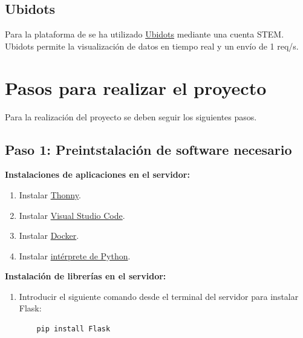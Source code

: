 \documentclass{article}
\begin{document}
\subsection{Ubidots}
Para la plataforma de se ha utilizado \href{https://stem.ubidots.com/}{Ubidots} mediante una cuenta STEM. Ubidots permite la visualización de datos en tiempo real y un envío de 1 req/s.

\section{Pasos para realizar el proyecto}
Para la realización del proyecto se deben seguir los siguientes pasos.
\subsection{Paso 1: Preintstalación de software necesario}
\textbf{Instalaciones de aplicaciones en el servidor:}
\begin{enumerate}
    \item Instalar \href{https://thonny.org/}{Thonny}.
    \item Instalar \href{https://code.visualstudio.com/download}{Visual Studio Code}.
    \item Instalar \href{https://docs.docker.com/get-docker/}{Docker}.
    \item Instalar \href{https://kinsta.com/es/base-de-conocimiento/instalar-python/}{intérprete de Python}.
\end{enumerate}

\textbf{Instalación de librerías en el servidor:}
\begin{enumerate}
    \item Introducir el siguiente comando desde el terminal del servidor para instalar Flask:
    \begin{verbatim}
    pip install Flask
    \end{verbatim}
\end{enumerate}
\end{document}
